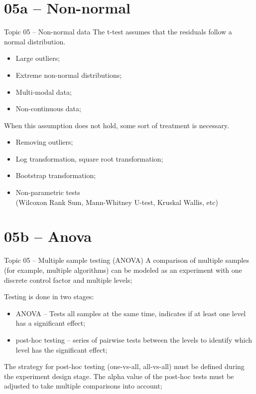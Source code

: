 
\section{05a -- Non-normal}

\begin{frame}[t]{Topic 05 -- Non-normal data}
  The t-test assumes that the residuals follow a normal distribution.
  \begin{itemize}
    \item Large outliers;
    \item Extreme non-normal distributions;
    \item Multi-modal data;
    \item Non-continuous data;
  \end{itemize}\bigskip


  When this assumption does not hold, some sort of treatment is necessary.
  \begin{itemize}
    \item Removing outliers;
    \item Log transformation, square root transformation;
    \item Bootstrap transformation;
    \item Non-parametric tests\\(Wilcoxon Rank Sum, Mann-Whitney U-test, Kruskal Wallis, etc)
  \end{itemize}\bigskip
\end{frame}


\section{05b -- Anova}

\begin{frame}[t]{Topic 05 -- Multiple sample testing (ANOVA)}
  A comparison of multiple samples (for example, multiple algorithms) can be modeled as an experiment with one discrete control factor and multiple levels;\bigskip

  Testing is done in two stages:
  \begin{itemize}
    \item ANOVA -- Tests all samples at the same time, indicates if at least one level has a significant effect;

    \item post-hoc testing -- series of pairwise tests between the levels to identify which level has the significant effect;
  \end{itemize}\bigskip

  The strategy for post-hoc testing (one-vs-all, all-vs-all) must be defined during the experiment design stage. The alpha value of the post-hoc tests must be adjusted to take multiple comparisons into account;

\end{frame}
